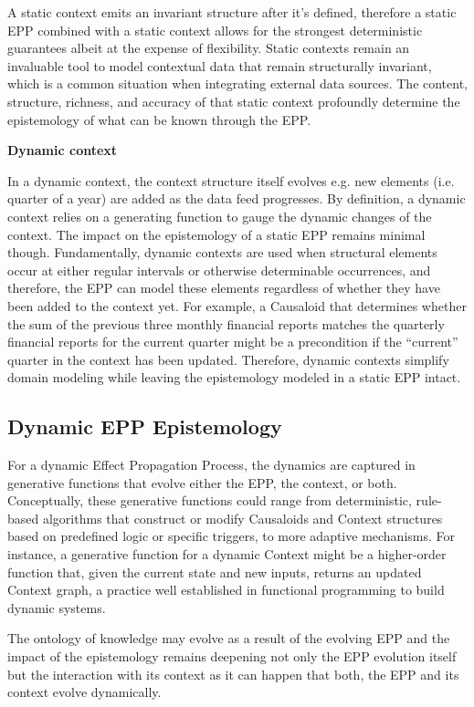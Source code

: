 A static context emits an invariant structure after it's defined, therefore a static EPP combined with a static context allows for the strongest deterministic guarantees albeit at the expense of flexibility. Static contexts remain an invaluable tool to model contextual data that remain structurally invariant, which is a common situation when integrating external data sources. The content, structure, richness, and accuracy of that static context profoundly determine the epistemology of what can be known through the EPP.

\textbf{Dynamic context}

In a dynamic context, the context structure itself evolves e.g. new elements (i.e. quarter of a year) are added as the data feed progresses. By definition, a dynamic context relies on a generating function to gauge the dynamic changes of the context. The impact on the epistemology of a static EPP remains minimal though.
Fundamentally, dynamic contexts are used when structural elements occur at either regular intervals or otherwise determinable occurrences, and therefore, the EPP can model these elements regardless of whether they have been added to the context yet.
For example, a Causaloid that determines whether the sum of the previous three monthly financial reports matches the quarterly financial reports for the current quarter might be a precondition if the “current” quarter in the context has been updated. Therefore, dynamic contexts simplify domain modeling while leaving the epistemology modeled in a static EPP intact.

\subsection{Dynamic EPP Epistemology}

For a dynamic Effect Propagation Process, the dynamics are captured in generative functions that evolve either the EPP, the context, or both. Conceptually, these generative functions could range from deterministic, rule-based algorithms that construct or modify Causaloids and Context structures based on predefined logic or specific triggers, to more adaptive mechanisms. For instance, a generative function for a dynamic Context might be a higher-order function that, given the current state and new inputs, returns an updated Context graph, a practice well established in functional programming to build dynamic systems.

The ontology of knowledge may evolve as a result of the evolving EPP and the impact of the epistemology remains deepening not only the EPP evolution itself but the interaction with its context as it can happen that both, the EPP and its context evolve dynamically.

